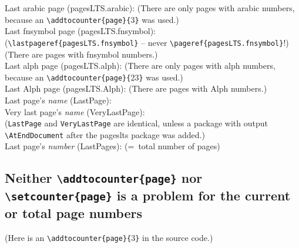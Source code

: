 \documentclass[british]{article}
\def\pagesLTSexampleArabic{3}
\def\pagesLTSexamplealph{23}
\begin{document}
\noindent Last arabic page (pagesLTS.arabic): 
(There are only  pages with arabic numbers,
because an \verb|\addtocounter{page}{|\pagesLTSexampleArabic\verb|}| was used.)\\

\noindent Last fnsymbol page (pagesLTS.fnsymbol):  \\
(\verb|\lastpageref{pagesLTS.fnsymbol}| -- never \verb|\pageref{pagesLTS.fnsymbol}|!)\\
(There are  pages with fnsymbol numbers.)\\

\noindent Last alph page (pagesLTS.alph): 
(There are only  pages with alph numbers,
because an \verb|\addtocounter{page}{|\pagesLTSexamplealph\verb|}| was used.)\\

\noindent Last Alph page (pagesLTS.Alph): 
(There are  pages with Alph numbers.)\\

\noindent Last page's \textit{name} (LastPage): \\

\noindent Very last page's \textit{name} (VeryLastPage): \\
(\texttt{LastPage} and \texttt{VeryLastPage} are identical, unless
a package with output \linebreak
\verb|\AtEndDocument| after the \textsf{pageslts} package was added.)\\

\noindent Last page's \textit{number} (LastPages): 
(=~total number of pages)\\

\lipsum[1-4]

\newpage

\subsection[addtocounter, setcounter]{Neither %
\texttt{\textbackslash addtocounter\{page\}} nor %
\texttt{\textbackslash setcounter\{page\}} is a problem for the %
current or total page numbers}

(Here is an \verb|\addtocounter{page}{|\pagesLTSexampleArabic\verb|}|
in the source code.)\\
\addtocounter{page}{\pagesLTSexampleArabic}
\end{document}

